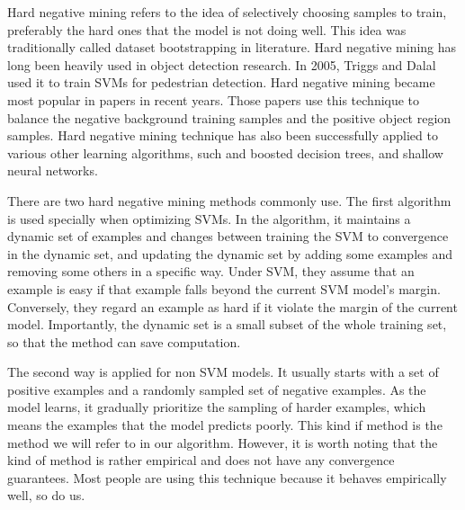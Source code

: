Hard negative mining refers to the idea of selectively choosing samples to train, preferably the hard ones that the model is not doing well. This idea was traditionally called dataset bootstrapping in literature\cite{sung1996learning}. Hard negative mining has long been heavily used in object detection research. In 2005, Triggs and Dalal\cite{dalal2005histograms} used it to train SVMs for pedestrian detection. Hard negative mining became most popular in papers in recent years\cite{shrivastava2016training,liu2016ssd,girshick2014rich,girshick2015fast,ren2015faster}. Those papers use this technique to balance the negative background training samples and the positive object region samples. Hard negative mining technique has also been successfully applied to various other learning algorithms, such and boosted decision trees, and shallow neural networks. 

There are two hard negative mining methods commonly use. The first algorithm is used specially when optimizing SVMs. In the algorithm, it maintains a dynamic set of examples and changes between training the SVM to convergence in the dynamic set, and updating the dynamic set by adding some examples and removing some others in a specific way\cite{felzenszwalb2010object}. Under SVM, they assume that an example is easy if that example falls beyond the current SVM model's margin. Conversely, they regard an example as hard if it violate the margin of the current model. Importantly, the dynamic set is a small subset of the whole training set, so that the method can save computation.

The second way is applied for non SVM models. It usually starts with a set of positive examples and a randomly sampled set of negative examples. As the model learns, it gradually prioritize the sampling of harder examples, which means the examples that the model predicts poorly. This kind if method is the method we will refer to in our algorithm. However, it is worth noting that the kind of method is rather empirical and does not have any convergence guarantees. Most people are using this technique because it behaves empirically well, so do us.

